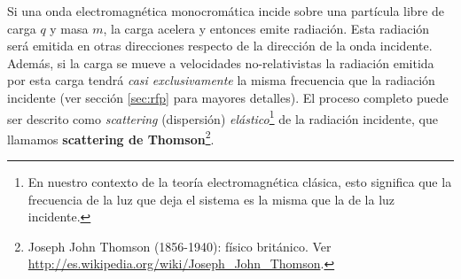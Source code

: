 
Si una onda electromagnética monocromática incide
sobre una partícula libre de carga $q$ y masa $m$, la carga acelera y
entonces emite radiación. Esta radiación será emitida en otras
direcciones respecto de la dirección de la onda incidente. Además, si la carga se mueve a velocidades no-relativistas la radiación emitida por esta carga tendrá \textit{casi exclusivamente} la misma frecuencia que la radiación incidente (ver sección \ref{sec:rfp} para mayores detalles). El proceso completo puede ser descrito como \textit{scattering} (dispersión) \textit{elástico}\footnote{En nuestro contexto de la teoría electromagnética clásica, esto significa que la frecuencia de la luz que deja el sistema es la misma que la de la luz incidente.} de la radiación incidente, que llamamos \textbf{scattering de Thomson}\footnote{Joseph John Thomson (1856-1940): físico británico. Ver \url{http://es.wikipedia.org/wiki/Joseph_John_Thomson}.}.


